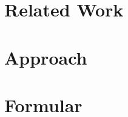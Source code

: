 \documentclass[]{report}
\title{}
\author{Jingyuan Sha}
\begin{document}
\maketitle

\begin{abstract}
\end{abstract}

\newpage
\chapter{Related Work}


\newpage
\chapter{Approach}



\newpage
\chapter{Formular}



\medskip



\end{document}
